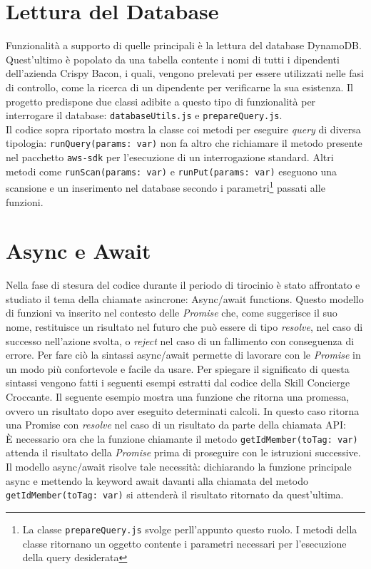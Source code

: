\newpage
\section{Lettura del Database}
Funzionalità a supporto di quelle principali è la lettura del database DynamoDB. Quest'ultimo è popolato da una tabella contente i nomi di tutti i dipendenti dell'azienda Crispy Bacon, i quali, vengono prelevati per essere utilizzati nelle fasi di controllo, come la ricerca di un dipendente per verificarne la sua esistenza. Il progetto predispone due classi adibite a questo tipo di funzionalità per interrogare il database: \texttt{databaseUtils.js} e \texttt{prepareQuery.js}.
\\[0.1cm]

Il codice sopra riportato mostra la classe coi metodi per eseguire \textit{query} di diversa tipologia: \texttt{runQuery(params:  var)} non fa altro che richiamare il metodo presente nel pacchetto \texttt{aws-sdk} per l'esecuzione di un interrogazione standard. Altri metodi come \texttt{runScan(params:  var)} e \texttt{runPut(params:  var)} eseguono una scansione e un inserimento nel database secondo i parametri\footnote{La classe \texttt{prepareQuery.js} svolge perll'appunto questo ruolo. I metodi della classe ritornano un oggetto contente i parametri necessari per l'esecuzione della query desiderata} passati alle funzioni.

\newpage
\section{Async e Await}
Nella fase di stesura del codice durante il periodo di tirocinio è stato affrontato e studiato il tema della chiamate asincrone: Async/await functions. Questo modello di funzioni va inserito nel contesto delle \textit{Promise} che, come suggerisce il suo nome, restituisce un risultato nel futuro che può essere di tipo \textit{resolve}, nel caso di successo nell'azione svolta, o \textit{reject} nel caso di un fallimento con conseguenza di errore. Per fare ciò la sintassi async/await permette di lavorare con le \textit{Promise} in un modo più confortevole e facile da usare. Per spiegare il significato di questa sintassi vengono fatti i seguenti esempi estratti dal codice della Skill Concierge Croccante. Il seguente esempio mostra una funzione che ritorna una promessa, ovvero un risultato dopo aver eseguito determinati calcoli. In questo caso ritorna una Promise con \textit{resolve} nel caso di un risultato da parte della chiamata API:
\\[0.1cm]

\noindent È necessario ora che la funzione chiamante il metodo \texttt{getIdMember(toTag: var)} attenda il risultato della \textit{Promise} prima di proseguire con le istruzioni successive. Il modello async/await risolve tale necessità: dichiarando la funzione principale async e mettendo la keyword await davanti alla chiamata del metodo \texttt{getIdMember(toTag: var)} si attenderà il risultato ritornato da quest'ultima.
\\[0.1cm]


